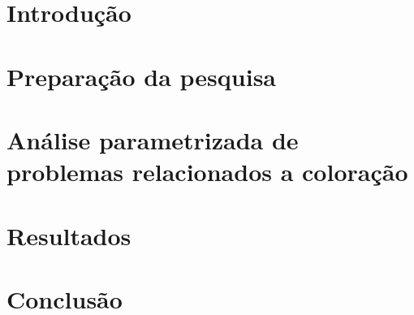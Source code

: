 \documentclass[a4paper,oneside,12pt]{book}
\begin{document}
\thispagestyle{myheadings}



\pagebreak
{}





\chapter{Introdução} \label{cap:introducao}
\chapter{Preparação da pesquisa}


\chapter{Análise parametrizada de problemas relacionados a coloração}
\chapter{Resultados}
\chapter{Conclusão}
\cleardoublepage
{}

%

\end{document}
